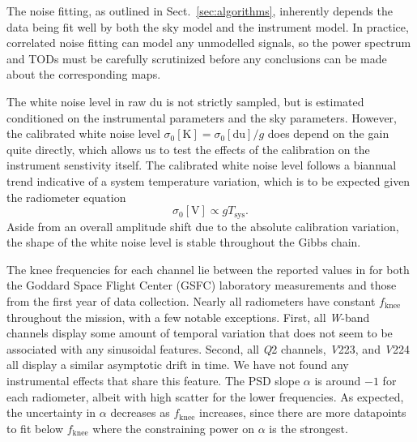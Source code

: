 \documentclass[twocolumn]{../../common/aa}
\newcommand{\Q}[0]{\textit Q}
\newcommand{\V}[0]{\textit V}
\newcommand{\W}[0]{\textit W}
\begin{document}
The noise fitting, as outlined in Sect.~\ref{sec:algorithms}, inherently depends the data being fit well by both the sky model and the instrument model. In practice, correlated noise fitting can model any unmodelled signals, so the power spectrum and TODs must be carefully scrutinized before any conclusions can be made about the corresponding maps.

The white noise level in raw du is not strictly sampled, but is estimated conditioned on the instrumental parameters and the sky parameters. However, the calibrated white noise level $\sigma_0[\mathrm K]=\sigma_0[\mathrm{du}]/g$ does depend on the gain quite directly, which allows us to test the effects of the calibration on the instrument senstivity itself. The calibrated white noise level follows a biannual trend indicative of a system temperature variation, which is to be expected given the radiometer equation
\begin{equation}
	\sigma_0[\mathrm V]\propto gT_\mathrm{sys}.
\end{equation}
Aside from an overall amplitude shift due to the absolute calibration variation, the shape of the white noise level is stable throughout the Gibbs chain.

The knee frequencies for each channel lie between the reported values in \citet{jarosik2003a} for both the Goddard Space Flight Center (GSFC) laboratory measurements and those from the first year of data collection. Nearly all radiometers have constant $f_\mathrm{knee}$ throughout the mission, with a few notable exceptions. First, all \W-band channels display some amount of temporal variation that does not seem to be associated with any sinusoidal features. Second, all \Q2 channels, \V223, and \V224 all display a similar asymptotic drift in time. We have not found any instrumental effects that share this feature.
The PSD slope $\alpha$ is around $-1$ for each radiometer, albeit with high scatter for the lower frequencies. As expected, the uncertainty in $\alpha$ decreases as $f_\mathrm{knee}$ increases, since there are more datapoints to fit below $f_\mathrm{knee}$ where the constraining power on $\alpha$ is the strongest.
\end{document}
